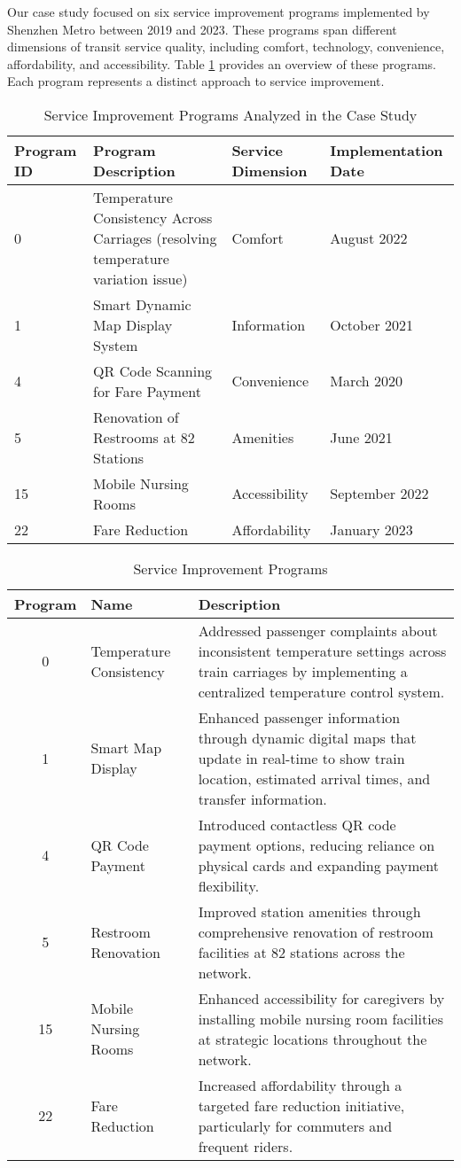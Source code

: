 \documentclass[a4paper,fleqn,12pt]{cas-sc}
\begin{document}
Our case study focused on six service improvement programs implemented by Shenzhen Metro between 2019 and 2023. These programs span different dimensions of transit service quality, including comfort, technology, convenience, affordability, and accessibility. Table \ref{tab:programs} provides an overview of these programs. Each program represents a distinct approach to service improvement.

\begin{table}[h]
\centering
\caption{Service Improvement Programs Analyzed in the Case Study}
\label{tab:programs}
\begin{tabular}{p{}p{}p{}p{}}
\hline
Program ID & Program Description & Service Dimension & Implementation Date \\
\hline
0 & Temperature Consistency Across Carriages (resolving temperature variation issue) & Comfort & August 2022 \\
1 & Smart Dynamic Map Display System & Information & October 2021 \\
4 & QR Code Scanning for Fare Payment & Convenience & March 2020 \\
5 & Renovation of Restrooms at 82 Stations & Amenities & June 2021 \\
15 & Mobile Nursing Rooms & Accessibility & September 2022 \\
22 & Fare Reduction & Affordability & January 2023 \\
\hline
\end{tabular}
\end{table}

\begin{table}[htbp]
\centering
\caption{Service Improvement Programs}
\begin{tabular}{|c|l|p{9cm}|}
\hline
\textbf{Program} & \textbf{Name} & \textbf{Description} \\
\hline
0 & Temperature Consistency & Addressed passenger complaints about inconsistent temperature settings across train carriages by implementing a centralized temperature control system. \\
\hline
1 & Smart Map Display & Enhanced passenger information through dynamic digital maps that update in real-time to show train location, estimated arrival times, and transfer information. \\
\hline
4 & QR Code Payment & Introduced contactless QR code payment options, reducing reliance on physical cards and expanding payment flexibility. \\
\hline
5 & Restroom Renovation & Improved station amenities through comprehensive renovation of restroom facilities at 82 stations across the network. \\
\hline
15 & Mobile Nursing Rooms & Enhanced accessibility for caregivers by installing mobile nursing room facilities at strategic locations throughout the network. \\
\hline
22 & Fare Reduction & Increased affordability through a targeted fare reduction initiative, particularly for commuters and frequent riders. \\
\hline
\end{tabular}
\end{table}
\end{document}
